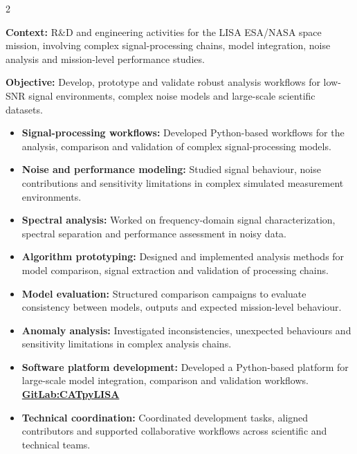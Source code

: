 \documentclass[8pt,a4paper,ragged2e,withhyper]{altacv}
\begin{document}
\begin{paracol}{2}
\divider


\textbf{Context:} R\&D and engineering activities for the LISA ESA/NASA space mission, involving complex signal-processing chains, model integration, noise analysis and mission-level performance studies.

\textbf{Objective:} Develop, prototype and validate robust analysis workflows for low-SNR signal environments, complex noise models and large-scale scientific datasets.

\begin{itemize}
\item \textbf{Signal-processing workflows:} Developed Python-based workflows for the analysis, comparison and validation of complex signal-processing models.
\item \textbf{Noise and performance modeling:} Studied signal behaviour, noise contributions and sensitivity limitations in complex simulated measurement environments.
\item \textbf{Spectral analysis:} Worked on frequency-domain signal characterization, spectral separation and performance assessment in noisy data.
\item \textbf{Algorithm prototyping:} Designed and implemented analysis methods for model comparison, signal extraction and validation of processing chains.
\item \textbf{Model evaluation:} Structured comparison campaigns to evaluate consistency between models, outputs and expected mission-level behaviour.
\item \textbf{Anomaly analysis:} Investigated inconsistencies, unexpected behaviours and sensitivity limitations in complex analysis chains.
\item \textbf{Software platform development:} Developed a Python-based platform for large-scale model integration, comparison and validation workflows. \textcolor{DarkPastelRed}{\href{https://gitlab.oca.eu/gboileau/lisa_l3_tools}{\bf GitLab:CATpyLISA}}
\item \textbf{Technical coordination:} Coordinated development tasks, aligned contributors and supported collaborative workflows across scientific and technical teams.
\end{itemize}

\divider



\end{paracol}
\end{document}
